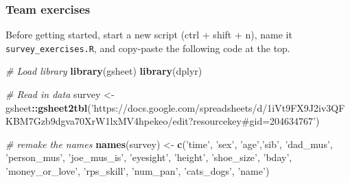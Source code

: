 \documentclass[
]{book}
\newenvironment{Shaded}{\begin{snugshade}}{\end{snugshade}}
\newcommand{\CommentTok}[1]{\textcolor[rgb]{0.56,0.35,0.01}{\textit{#1}}}
\newcommand{\KeywordTok}[1]{\textcolor[rgb]{0.13,0.29,0.53}{\textbf{#1}}}
\newcommand{\NormalTok}[1]{#1}
\newcommand{\OperatorTok}[1]{\textcolor[rgb]{0.81,0.36,0.00}{\textbf{#1}}}
\newcommand{\StringTok}[1]{\textcolor[rgb]{0.31,0.60,0.02}{#1}}
\begin{document}
\hypertarget{team-exercises}{%
\subsubsection*{Team exercises}\label{team-exercises}}

Before getting started, start a new script (ctrl + shift + n), name it \texttt{survey\_exercises.R}, and copy-paste the following code at the top.

\begin{Shaded}
\begin{Highlighting}[]
\CommentTok{# Load library}
\KeywordTok{library}\NormalTok{(gsheet)}
\KeywordTok{library}\NormalTok{(dplyr)}

\CommentTok{# Read in data}
\NormalTok{survey  <-}\StringTok{ }\NormalTok{gsheet}\OperatorTok{::}\KeywordTok{gsheet2tbl}\NormalTok{(}\StringTok{'https://docs.google.com/spreadsheets/d/1iVt9FX9J2iv3QFKBM7Gzb9dgva70XrW1lxMV4hpekeo/edit?resourcekey#gid=204634767'}\NormalTok{)}

\CommentTok{# remake the names}
\KeywordTok{names}\NormalTok{(survey) <-}\StringTok{ }\KeywordTok{c}\NormalTok{(}\StringTok{'time'}\NormalTok{, }\StringTok{'sex'}\NormalTok{, }\StringTok{'age'}\NormalTok{,}\StringTok{'sib'}\NormalTok{, }\StringTok{'dad_mus'}\NormalTok{, }\StringTok{'person_mus'}\NormalTok{, }\StringTok{'joe_mus_is'}\NormalTok{, }\StringTok{'eyesight'}\NormalTok{, }\StringTok{'height'}\NormalTok{, }\StringTok{'shoe_size'}\NormalTok{, }\StringTok{'bday'}\NormalTok{, }\StringTok{'money_or_love'}\NormalTok{, }\StringTok{'rps_skill'}\NormalTok{, }\StringTok{'num_pan'}\NormalTok{, }\StringTok{'cats_dogs'}\NormalTok{, }\StringTok{'name'}\NormalTok{)}
\end{Highlighting}
\end{Shaded}
\end{document}
